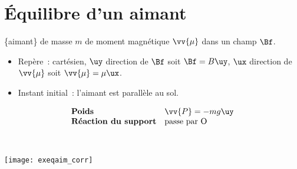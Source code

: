 \documentclass[a4paper, 11pt, final, garamond]{book}
\begin{document}
\section{Équilibre d'un aimant}
\label{sec:exeqaim}
\noindent
\begin{minipage}[t]{.6\linewidth}
  \begin{itemize}[label=$\diamond$, leftmargin=10pt]
   \{aimant\} de masse $m$ de moment magnétique $\vv{\mu}$ dans
  un champ $\Bf$.
    \begin{itemize}[label=$\triangleright$, leftmargin=10pt]
      \item Repère~: cartésien, $\uy$ direction de $\Bf$
          soit $\Bf = B\uy$, $\ux$ direction de $\vv{\mu}$ soit $\vv{\mu}
          = \mu \ux$.
      \item Instant initial~: l'aimant est parallèle au sol.
    \end{itemize}
    \[
      \begin{array}{ll}
        \textbf{Poids} & \vv{P} = -mg \uy
        \\
        \textbf{Réaction du support} & \text{passe par O}
      \end{array}
    \]
  \end{itemize}
\end{minipage}
\hfill
\begin{minipage}[t]{.39\linewidth}
  ~
  \vspace*{-10pt}
  \begin{center}
    \texttt{[image: exeqaim\_corr]}
    \label{fig:exeqaimcorr}
  \end{center}
\end{minipage}
\smallbreak
\end{document}
